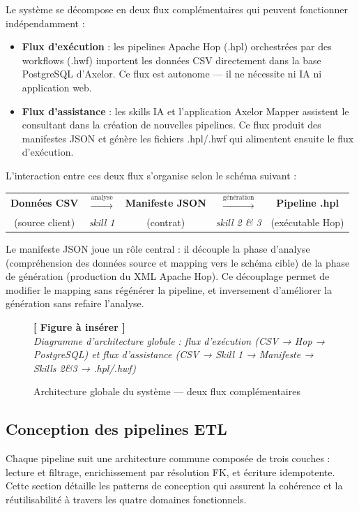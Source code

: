 \documentclass[a4paper,12pt]{article}
\newcommand{\insertfig}[3][0.80]{%
  \begin{figure}[H]
  \centering
  \colorbox{placeholderbg}{\parbox{#1\textwidth}{%
    \vspace{1.6cm}
    \centering
    {\large\color{placeholderborder}\textbf{[ Figure à insérer ]}}\\[0.5cm]
    {\small\color{gray}\textit{#2}}%
    \vspace{1.6cm}
  }}
  \caption{#3}
  \end{figure}
}
\begin{document}
Le système se décompose en deux flux complémentaires qui peuvent fonctionner indépendamment :

\begin{itemize}
  \item \textbf{Flux d'exécution} : les pipelines Apache Hop (.hpl) orchestrées par des workflows (.hwf) importent les données CSV directement dans la base PostgreSQL d'Axelor. Ce flux est autonome — il ne nécessite ni IA ni application web.
  \item \textbf{Flux d'assistance} : les skills IA et l'application Axelor Mapper assistent le consultant dans la création de nouvelles pipelines. Ce flux produit des manifestes JSON et génère les fichiers .hpl/.hwf qui alimentent ensuite le flux d'exécution.
\end{itemize}

L'interaction entre ces deux flux s'organise selon le schéma suivant :

\begin{center}
\begin{tabular}{ccccc}
\textbf{Données CSV} & $\xrightarrow{\text{analyse}}$ & \textbf{Manifeste JSON} & $\xrightarrow{\text{génération}}$ & \textbf{Pipeline .hpl} \\
(source client) & \textit{skill 1} & (contrat) & \textit{skill 2 \& 3} & (exécutable Hop) \\
\end{tabular}
\end{center}

\medskip
Le manifeste JSON joue un rôle central : il découple la phase d'analyse (compréhension des données source et mapping vers le schéma cible) de la phase de génération (production du XML Apache Hop). Ce découplage permet de modifier le mapping sans régénérer la pipeline, et inversement d'améliorer la génération sans refaire l'analyse.

\insertfig{Diagramme d'architecture globale : flux d'exécution (CSV → Hop → PostgreSQL) et flux d'assistance (CSV → Skill 1 → Manifeste → Skills 2\&3 → .hpl/.hwf)}{Architecture globale du système — deux flux complémentaires}

\subsection{Conception des pipelines ETL}

Chaque pipeline suit une architecture commune composée de trois couches : lecture et filtrage, enrichissement par résolution FK, et écriture idempotente. Cette section détaille les patterns de conception qui assurent la cohérence et la réutilisabilité à travers les quatre domaines fonctionnels.
\end{document}
